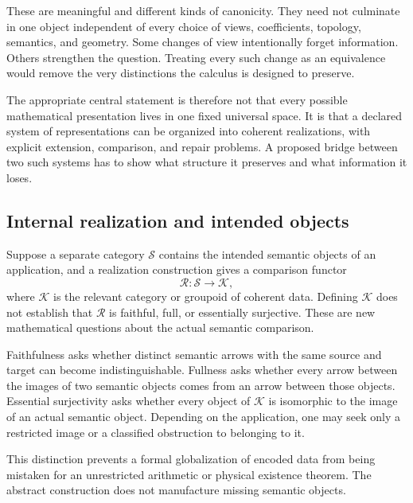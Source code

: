 These are meaningful and different kinds of canonicity. They need not culminate in one object independent of every choice of views, coefficients, topology, semantics, and geometry. Some changes of view intentionally forget information. Others strengthen the question. Treating every such change as an equivalence would remove the very distinctions the calculus is designed to preserve.

The appropriate central statement is therefore not that every possible mathematical presentation lives in one fixed universal space. It is that a declared system of representations can be organized into coherent realizations, with explicit extension, comparison, and repair problems. A proposed bridge between two such systems has to show what structure it preserves and what information it loses.

\subsection{Internal realization and intended objects}
Suppose a separate category \(\mathcal S\) contains the intended semantic objects of an application, and a realization construction gives a comparison functor
\[
 \mathcal R:\mathcal S\longrightarrow\mathcal K,
\]
where \(\mathcal K\) is the relevant category or groupoid of coherent data. Defining \(\mathcal K\) does not establish that \(\mathcal R\) is faithful, full, or essentially surjective. These are new mathematical questions about the actual semantic comparison.

Faithfulness asks whether distinct semantic arrows with the same source and target can become indistinguishable. Fullness asks whether every arrow between the images of two semantic objects comes from an arrow between those objects. Essential surjectivity asks whether every object of \(\mathcal K\) is isomorphic to the image of an actual semantic object. Depending on the application, one may seek only a restricted image or a classified obstruction to belonging to it.

This distinction prevents a formal globalization of encoded data from being mistaken for an unrestricted arithmetic or physical existence theorem. The abstract construction does not manufacture missing semantic objects.


